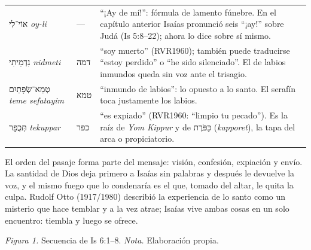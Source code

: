 \documentclass[11pt,letterpaper]{article}
\newcommand{\heb}[1]{\mbox{\foreignlanguage{hebrew}{#1}}}
\begin{document}
\begin{filologia}[Is 6:5--7]
\begin{tabular}{@{}L{3.2cm}L{1.6cm}L{10cm}@{}}
\heb{אוֹי־לִי} \emph{oy-li} & --- & ``¡Ay de mí!'': fórmula de lamento fúnebre. En el capítulo anterior Isaías pronunció seis ``¡ay!'' sobre Judá (Is 5:8--22); ahora lo dice sobre sí mismo. \\[2pt]
\heb{נִדְמֵיתִי} \emph{nidmeti} & \heb{דמה} & ``soy muerto'' (RVR1960); también puede traducirse ``estoy perdido'' o ``he sido silenciado''. El de labios inmundos queda sin voz ante el trisagio. \\[2pt]
\heb{טְמֵא־שְׂפָתַיִם} \emph{teme sefatayim} & \heb{טמא} & ``inmundo de labios'': lo opuesto a lo santo. El serafín toca justamente los labios. \\[2pt]
\heb{תְּכֻפָּר} \emph{tekuppar} & \heb{כפר} & ``es expiado'' (RVR1960: ``limpio tu pecado''). Es la raíz de \emph{Yom Kippur} y de \heb{כַּפֹּרֶת} (\emph{kapporet}), la tapa del arca o propiciatorio. \\
\end{tabular}
\end{filologia}

El orden del pasaje forma parte del mensaje: visión, confesión, expiación y envío. La santidad de Dios deja primero a Isaías sin palabras y después le devuelve la voz, y el mismo fuego que lo condenaría es el que, tomado del altar, le quita la culpa. Rudolf Otto (1917/1980) describió la experiencia de lo santo como un misterio que hace temblar y a la vez atrae; Isaías vive ambas cosas en un solo encuentro: tiembla y luego se ofrece.

\begin{center}
\par
{\footnotesize\color{gris}\textit{Figura 1.} Secuencia de Is 6:1--8. \textit{Nota.} Elaboración propia.}
\end{center}
\end{document}
